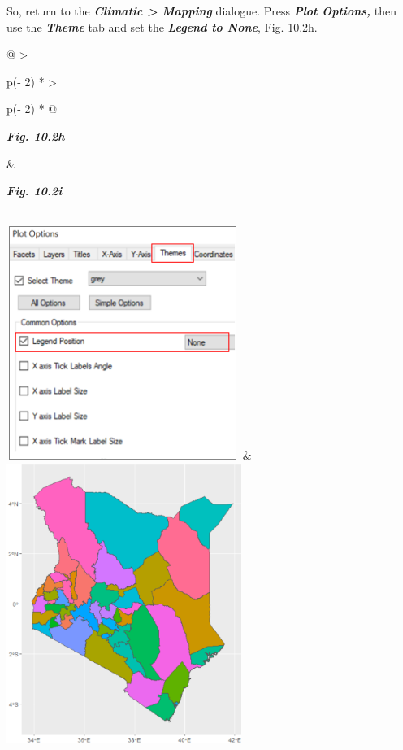 \documentclass[
  letterpaper,
  DIV=11,
  numbers=noendperiod]{scrreprt}
\begin{document}
So, return to the \textbf{\emph{Climatic \textgreater{} Mapping}}
dialogue. Press \textbf{\emph{Plot Options,}} then use the
\textbf{\emph{Theme}} tab and set the \textbf{\emph{Legend to None}},
Fig. 10.2h.

\begin{longtable}[]{@{}
  >{\raggedright\arraybackslash}p{(\columnwidth - 2\tabcolsep) * }
  >{\raggedright\arraybackslash}p{(\columnwidth - 2\tabcolsep) * }@{}}
\toprule\noalign{}
\begin{minipage}[b]{\linewidth}\raggedright
\textbf{\emph{Fig. 10.2h}}
\end{minipage} & \begin{minipage}[b]{\linewidth}\raggedright
\textbf{\emph{Fig. 10.2i}}
\end{minipage} \\
\midrule\noalign{}
\endhead
\bottomrule\noalign{}
\endlastfoot
\includegraphics[width=2.9793in,height=2.98538in]{figures/Fig10.2h.png}
&
\includegraphics[width=3.00558in,height=3.58809in]{figures/Fig10.2i.png} \\
\end{longtable}
\end{document}
